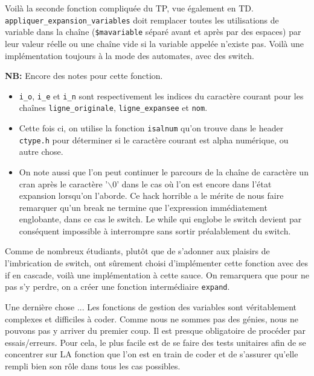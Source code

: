\documentclass[10pt]{article}
\begin{document}
\begin{enumerate}[label=\textbf{[\alph*]}]
\item Voilà la seconde fonction compliquée du TP, vue également en
  TD. \texttt{appliquer\_expansion\_variables} doit remplacer toutes
  les utilisations de variable dans la chaîne (\texttt{\$mavariable}
  séparé avant et après par des espaces) par leur valeur réelle ou une
  chaîne vide si la variable appelée n'existe pas. Voilà une
  implémentation toujours à la mode des automates, avec des switch.

  

  \vspace{0.2cm}
  \textbf{NB: } Encore des notes pour cette fonction.
  \begin{itemize}
  \item \texttt{i\_o}, \texttt{i\_e} et \texttt{i\_n} sont
    respectivement les indices du caractère courant pour les chaînes
    \texttt{ligne\_originale}, \texttt{ligne\_expansee} et
    \texttt{nom}.
  \item Cette fois ci, on utilise la fonction \texttt{isalnum} qu'on
    trouve dans le header \texttt{ctype.h} pour déterminer si le
    caractère courant est alpha numérique, ou autre chose.
  \item On note aussi que l'on peut continuer le parcours de la
    chaîne de caractère un cran après le caractère '$\backslash$0'
    dans le cas où l'on est encore dans l'état expansion lorsqu'on
    l'aborde. Ce hack horrible a le mérite de nous faire remarquer
    qu'un break ne termine que l'expression immédiatement englobante,
    dans ce cas le switch. Le while qui englobe le switch devient par
    conséquent impossible à interrompre sans sortir préalablement du
    switch.
  \end{itemize}

  \vspace{0.2cm}
  Comme de nombreux étudiants, plutôt que de s'adonner aux plaisirs de
  l'imbrication de switch, ont sûrement choisi d'implémenter cette
  fonction avec des if en cascade, voilà une implémentation à cette
  sauce. On remarquera que pour ne pas s'y perdre, on a créer une
  fonction intermédiaire \texttt{expand}.

  

  \vspace{0.2cm}
  Une dernière chose ... Les fonctions de gestion des variables sont
  véritablement complexes et difficiles à coder. Comme nous ne sommes
  pas des génies, nous ne pouvons pas y arriver du premier coup. Il
  est presque obligatoire de procéder par essais/erreurs. Pour cela,
  le plus facile est de se faire des tests unitaires afin de se
  concentrer sur LA fonction que l'on est en train de coder et de
  s'assurer qu'elle rempli bien son rôle dans tous les cas possibles.


\end{enumerate}
\end{document}
